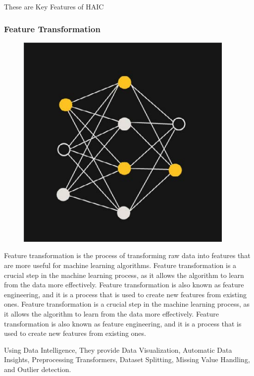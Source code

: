\documentclass[12pt,a4paper]{report}
\begin{document}
These are Key Features of \ac{HAIC} 

\subsubsection{Feature Transformation}
\begin{figure}
\includegraphics[width=1\linewidth]{ft.png} 
\end{figure}
Feature transformation is the process of transforming raw data into features that are more useful for machine learning algorithms. Feature transformation is a crucial step in the machine learning process, as it allows the algorithm to learn from the data more effectively. Feature transformation is also known as feature engineering, and it is a process that is used to create new features from existing ones. Feature transformation is a crucial step in the machine learning process, as it allows the algorithm to learn from the data more effectively. Feature transformation is also known as feature engineering, and it is a process that is used to create new features from existing ones.

Using Data Intelligence, They provide Data Visualization, Automatic Data Insights, Preprocessing Transformers, Dataset Splitting, Missing Value Handling, and Outlier detection.
\end{document}
